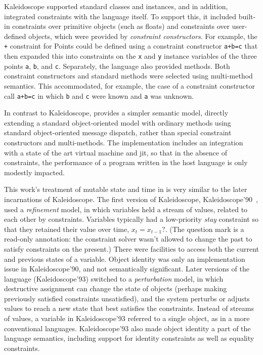 Kaleidoscope supported standard classes and instances, and in
addition, integrated constraints with the language itself.  To support
this, it included built-in constraints over primitive objects (such as
floats) and constraints over user-defined objects, which were provided
by \emph{constraint constructors}.  For example, the \lstinline{+}
constraint for Points could be defined using a constraint constructor
\lstinline{a+b=c} that then expanded this into constraints on the
\lstinline{x} and \lstinline{y} instance variables of the three points
\lstinline{a}, \lstinline{b}, and \lstinline{c}.  Separately, the
language also provided methods.  Both constraint constructors and
standard methods were selected using multi-method semantics.  This
accommodated, for example, the case of a constraint constructor call
\lstinline{a+b=c} in which \lstinline{b} and \lstinline{c} were known
and \lstinline{a} was unknown.

In contrast to Kaleidoscope, \langname provides a simpler semantic
model, directly extending a standard object-oriented model with
ordinary methods using standard object-oriented message dispatch,
rather than special constraint constructors and multi-methods.  The
implementation includes an integration with a state of the art virtual
machine and \ac{jit}, so that in the absence of constraints, the
performance of a program written in the host language is only modestly impacted.

This work's treatment of mutable state and time in \langname is very
similar to the later incarnations of Kaleidoscope. The first version
of Kaleidoscope, Kaleidoscope'90~\cite{freeman-benson-iccl-1992}, used
a \emph{refinement} model, in which variables held a stream of values,
related to each other by constraints.  Variables typically had a
low-priority \emph{stay} constraint so that they retained their value
over time, \eg \mbox{$x_t = x_{t-1}?$}.  (The question mark is a
read-only annotation: the constraint solver wasn't allowed to change
the past to satisfy constraints on the present.)  There were
facilities to access both the current and previous states of a
variable.  Object identity was only an implementation issue in
Kaleidoscope'90, and not semantically significant.
Later versions of the language (\eg Kaleidoscope'93)
\cite{lopez-ecoop-1994,lopez-oopsla-1994} switched to a
\emph{perturbation} model, in which destructive assignment can change
the state of objects (perhaps making previously satisfied constraints
unsatisfied), and the system perturbs or adjusts values to reach a new
state that best satisfies the constraints. Instead of streams of
values, a variable in Kaleidoscope'93 referred to a single object, as
in a more conventional languages.  Kaleidoscope'93 also made object
identity a part of the language semantics, including support for
identity constraints as well as equality constraints.

